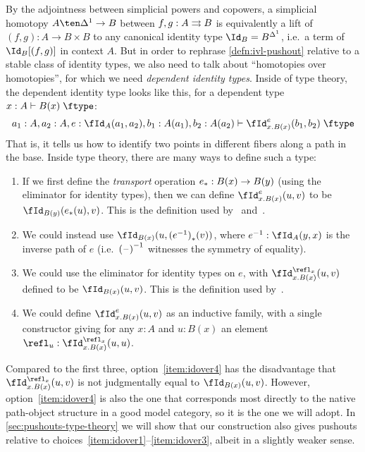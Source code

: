 By the adjointness between simplicial powers and copowers, a simplicial homotopy $A\ten\ivl \to B$ between $f,g:A\rightrightarrows B$ is equivalently a lift of $(f,g):A\to B\times B$ to any canonical identity type $\Id_B = B^\ivl$, i.e.\ a term of $\Id_B[(f,g)]$ in context $A$.
But in order to rephrase \cref{defn:ivl-pushout} relative to a stable class of identity types, we also need to talk about ``homotopies over homotopies'', for which we need \emph{dependent identity types}.
Inside of type theory, the dependent identity type looks like this, for a dependent type $x:A \types B(x)\type$:
\[ a_1:A, a_2:A, e:\id[A]{a_1}{a_2}, b_1:A(a_1), b_2:A(a_2) \types \idover[x.B(x)]{b_1}{b_2}{e} \type \]
That is, it tells us how to identify two points in different fibers along a path in the base.
Inside type theory, there are many ways to define such a type:
\begin{enumerate}\label{idover}
\item If we first define the \emph{transport} operation ${e}_{*}:B(x) \to B(y)$ (using the eliminator for identity types), then we can define $\idover[x.B(x)]{u}{v}{e}$ to be $\id[B(y)]{\transf{e}(u)}{v}$.
  This is the definition used by~\cite{hottbook} and~\cite{hottcoq,bglsss:hottcoq}.\label{item:idover1}
\item We could instead use $\id[B(x)]{u}{\transf{(\opp{e})}(v)}$, where $\opp{e}:\id[A]{y}{x}$ is the inverse path of $e$ (i.e.\ $\mathord{{(\mathord{\hspace{1pt}\text{--}\hspace{1pt}})}^{-1}}$ witnesses the symmetry of equality).\label{item:idover2}
\item We could use the eliminator for identity types on $e$, with $\idover[x.B(x)]{u}{v}{\refl_x}$ defined to be $\id[B(x)]{u}{v}$.
  This is the definition used by~\cite{hottagda}.\label{item:idover3}
\item We could define $\idover[x.B(x)]{u}{v}{e}$ as an inductive family, with a single constructor giving for any $x:A$ and $u:B(x)$ an element $\refl_u : \idover[x.B(x)]{u}{u}{\refl_x}$.\label{item:idover4}
\end{enumerate}
Compared to the first three, option~\ref{item:idover4} has the disadvantage that $\idover[x.B(x)]{u}{v}{\refl_x}$ is not judgmentally equal to $\id[B(x)]{u}{v}$.
However, option~\ref{item:idover4} is also the one that corresponds most directly to the native path-object structure in a good model category, so it is the one we will adopt.
In \cref{sec:pushouts-type-theory} we will show that our construction also gives pushouts relative to choices~\ref{item:idover1}--\ref{item:idover3}, albeit in a slightly weaker sense.

